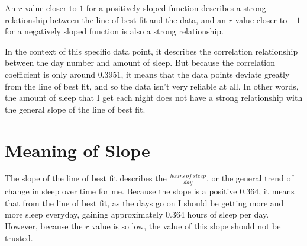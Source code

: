 \documentclass[index]{subfiles}
\begin{document}
An \(r\) value closer to \(1\) for a positively sloped function describes a strong relationship between the line of best fit and the data, and an \(r\) value closer to \(-1\) for a negatively sloped function is also a strong relationship.

In the context of this specific data point, it describes the correlation relationship between the day number and amount of sleep. But because the correlation coefficient is only around \(0.3951\), it means that the data points deviate greatly from the line of best fit, and so the data isn't very reliable at all. In other words, the amount of sleep that I get each night does not have a strong relationship with the general slope of the line of best fit.

\section{Meaning of Slope}

The slope of the line of best fit describes the \(\frac{hours\ of\  sleep}{day}\), or the general trend of change in sleep over time for me. Because the slope is a positive \(0.364\), it means that from the line of best fit, as the days go on I should be getting more and more sleep everyday, gaining approximately \(0.364\) hours of sleep per day. However, because the \(r\) value is so low, the value of this slope should not be trusted.
\end{document}
